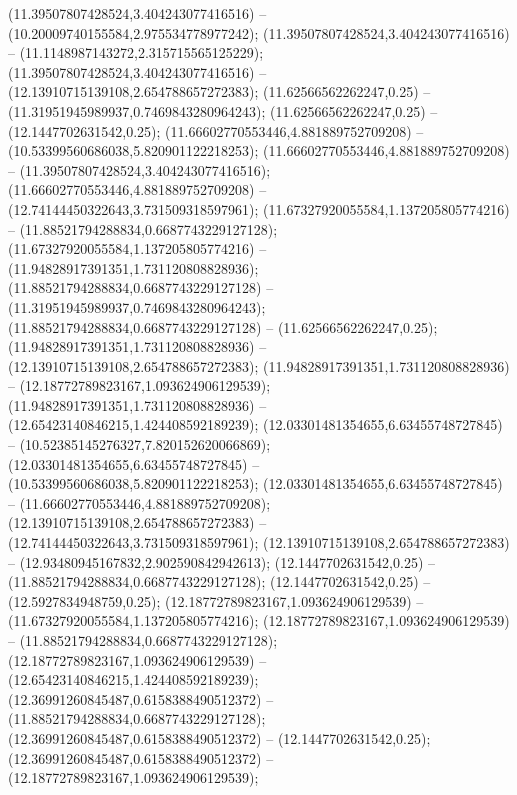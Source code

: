  (11.39507807428524,3.404243077416516) -- (10.20009740155584,2.975534778977242);
 (11.39507807428524,3.404243077416516) -- (11.1148987143272,2.315715565125229);
 (11.39507807428524,3.404243077416516) -- (12.13910715139108,2.654788657272383);
 (11.62566562262247,0.25) -- (11.31951945989937,0.7469843280964243);
 (11.62566562262247,0.25) -- (12.1447702631542,0.25);
 (11.66602770553446,4.881889752709208) -- (10.53399560686038,5.820901122218253);
 (11.66602770553446,4.881889752709208) -- (11.39507807428524,3.404243077416516);
 (11.66602770553446,4.881889752709208) -- (12.74144450322643,3.731509318597961);
 (11.67327920055584,1.137205805774216) -- (11.88521794288834,0.6687743229127128);
 (11.67327920055584,1.137205805774216) -- (11.94828917391351,1.731120808828936);
 (11.88521794288834,0.6687743229127128) -- (11.31951945989937,0.7469843280964243);
 (11.88521794288834,0.6687743229127128) -- (11.62566562262247,0.25);
 (11.94828917391351,1.731120808828936) -- (12.13910715139108,2.654788657272383);
 (11.94828917391351,1.731120808828936) -- (12.18772789823167,1.093624906129539);
 (11.94828917391351,1.731120808828936) -- (12.65423140846215,1.424408592189239);
 (12.03301481354655,6.63455748727845) -- (10.52385145276327,7.820152620066869);
 (12.03301481354655,6.63455748727845) -- (10.53399560686038,5.820901122218253);
 (12.03301481354655,6.63455748727845) -- (11.66602770553446,4.881889752709208);
 (12.13910715139108,2.654788657272383) -- (12.74144450322643,3.731509318597961);
 (12.13910715139108,2.654788657272383) -- (12.93480945167832,2.902590842942613);
 (12.1447702631542,0.25) -- (11.88521794288834,0.6687743229127128);
 (12.1447702631542,0.25) -- (12.5927834948759,0.25);
 (12.18772789823167,1.093624906129539) -- (11.67327920055584,1.137205805774216);
 (12.18772789823167,1.093624906129539) -- (11.88521794288834,0.6687743229127128);
 (12.18772789823167,1.093624906129539) -- (12.65423140846215,1.424408592189239);
 (12.36991260845487,0.6158388490512372) -- (11.88521794288834,0.6687743229127128);
 (12.36991260845487,0.6158388490512372) -- (12.1447702631542,0.25);
 (12.36991260845487,0.6158388490512372) -- (12.18772789823167,1.093624906129539);
